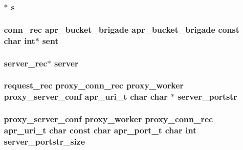 \subsubsection[{\texorpdfstring{s}{s}}]{$\ast$ s}\hypertarget{group__MOD__PROXY_gac4d70082e9974ebc2dabf813f28a90e6}{}\label{group__MOD__PROXY_gac4d70082e9974ebc2dabf813f28a90e6}
\subsubsection[{\texorpdfstring{sent}{sent}}]{ {\bf conn\+\_\+rec} {\bf apr\+\_\+bucket\+\_\+brigade} {\bf apr\+\_\+bucket\+\_\+brigade} const char {\bf int}$\ast$ sent}\hypertarget{group__MOD__PROXY_gac5561b42c6c7f77be9a789f039116fc1}{}\label{group__MOD__PROXY_gac5561b42c6c7f77be9a789f039116fc1}
\subsubsection[{\texorpdfstring{server}{server}}]{ {\bf server\+\_\+rec}$\ast$ server}\hypertarget{group__MOD__PROXY_ga2acf16edec2c4c358a31d7a558e5f15c}{}\label{group__MOD__PROXY_ga2acf16edec2c4c358a31d7a558e5f15c}
\subsubsection[{\texorpdfstring{server\+\_\+portstr}{server_portstr}}]{ {\bf request\+\_\+rec} {\bf proxy\+\_\+conn\+\_\+rec} {\bf proxy\+\_\+worker} {\bf proxy\+\_\+server\+\_\+conf} {\bf apr\+\_\+uri\+\_\+t} char char $\ast$ server\+\_\+portstr}\hypertarget{group__MOD__PROXY_ga802fad35b3c2f0228598874c678130a6}{}\label{group__MOD__PROXY_ga802fad35b3c2f0228598874c678130a6}
\subsubsection[{\texorpdfstring{server\+\_\+portstr\+\_\+size}{server_portstr_size}}]{ {\bf proxy\+\_\+server\+\_\+conf} {\bf proxy\+\_\+worker} {\bf proxy\+\_\+conn\+\_\+rec} {\bf apr\+\_\+uri\+\_\+t} char const char {\bf apr\+\_\+port\+\_\+t} char {\bf int} server\+\_\+portstr\+\_\+size}\hypertarget{group__MOD__PROXY_gace3850b28542570d38229df96ad5cdb8}{}\label{group__MOD__PROXY_gace3850b28542570d38229df96ad5cdb8}
